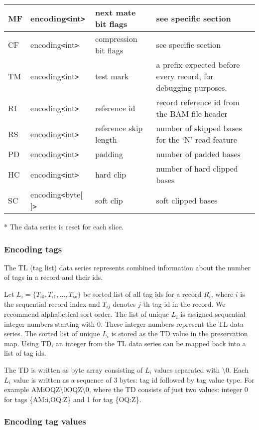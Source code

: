 \documentclass[a4paper]{article}
\begin{document}
\begin{tabular}{|l|l|>{\raggedright}p{100pt}|>{\raggedright}p{220pt}|}
\hline
MF & encoding\texttt{<}int\texttt{>} & next mate bit flags & see specific section\tabularnewline
\hline
CF & encoding\texttt{<}int\texttt{>} & compression bit flags & see specific section\tabularnewline
\hline
TM & encoding\texttt{<}int\texttt{>} & test mark & a prefix expected before every 
record, for debugging purposes.\tabularnewline
\hline
RI & encoding\texttt{<}int\texttt{>} & reference id & record reference id from 
the BAM file header\tabularnewline
\hline
RS & encoding\texttt{<}int\texttt{>} & reference skip length & number of skipped 
bases for the `N' read feature\tabularnewline
\hline
PD & encoding\texttt{<}int\texttt{>} & padding & number of padded bases\tabularnewline
\hline
HC & encoding\texttt{<}int\texttt{>} & hard clip & number of hard clipped bases\tabularnewline
\hline
SC & encoding\texttt{<}byte[ ]\texttt{>} & soft clip & soft clipped bases\tabularnewline
\hline
\end{tabular}

* The data series is reset for each slice. 

\subsubsection*{Encoding tags}

The TL (tag list) data series represents combined information about the number 
of tags in a record and their ids. 

Let $L_{i}=\{T_{i0}, T_{i1}, \ldots, T_{ix}\}$
be sorted list of all tag ids for a record $R_{i}$, where $i$ is the sequential 
record index and $T_{ij}$ denotes $j$-th tag id in the record. We recommend 
alphabetical sort order. The list of unique $L_{i}$ is assigned sequential 
integer numbers starting with 0. These integer numbers represent the TL data series. 
The sorted list of unique $L_{i}$ is stored as the TD value in the preservation 
map. Using TD, an integer from the TL data series can be mapped back into a list 
of tag ids. 

The TD is written as byte array consisting of $L_{i}$ values separated 
with \textbackslash{}0. Each $L_{i}$ value is written as a sequence 
of 3 bytes: tag id followed by tag value type. For example AMiOQZ\textbackslash{}0OQZ\textbackslash{}0, 
where the TD consists of just two values: integer 0 for tags \{AM:i,OQ:Z\} and 
1 for tag \{OQ:Z\}.

\subsubsection*{Encoding tag values}
\end{document}
